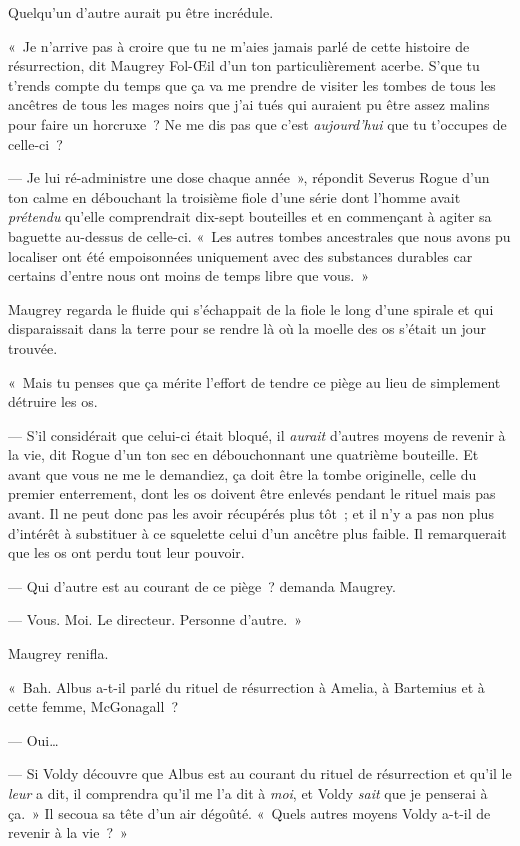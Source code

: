 Quelqu'un d'autre aurait pu être incrédule.

«~Je n'arrive pas à croire que tu ne m'aies jamais parlé de cette histoire de résurrection, dit Maugrey Fol-Œil d'un ton particulièrement acerbe. S'que tu t'rends compte du temps que ça va me prendre de visiter les tombes de tous les ancêtres de tous les mages noirs que j'ai tués qui auraient pu être assez malins pour faire un horcruxe~? Ne me dis pas que c'est \emph{aujourd'hui} que tu t'occupes de celle-ci~?

--- Je lui ré-administre une dose chaque année~», répondit Severus Rogue d'un ton calme en débouchant la troisième fiole d'une série dont l'homme avait \emph{prétendu} qu'elle comprendrait dix-sept bouteilles et en commençant à agiter sa baguette au-dessus de celle-ci. «~Les autres tombes ancestrales que nous avons pu localiser ont été empoisonnées uniquement avec des substances durables car certains d'entre nous ont moins de temps libre que vous.~»

Maugrey regarda le fluide qui s'échappait de la fiole le long d'une spirale et qui disparaissait dans la terre pour se rendre là où la moelle des os s'était un jour trouvée.

«~Mais tu penses que ça mérite l'effort de tendre ce piège au lieu de simplement détruire les os.

--- S'il considérait que celui-ci était bloqué, il \emph{aurait} d'autres moyens de revenir à la vie, dit Rogue d'un ton sec en débouchonnant une quatrième bouteille. Et avant que vous ne me le demandiez, ça doit être la tombe originelle, celle du premier enterrement, dont les os doivent être enlevés pendant le rituel mais pas avant. Il ne peut donc pas les avoir récupérés plus tôt~; et il n'y a pas non plus d'intérêt à substituer à ce squelette celui d'un ancêtre plus faible. Il remarquerait que les os ont perdu tout leur pouvoir.

--- Qui d'autre est au courant de ce piège~? demanda Maugrey.

--- Vous. Moi. Le directeur. Personne d'autre.~»

Maugrey renifla.

«~Bah. Albus a-t-il parlé du rituel de résurrection à Amelia, à Bartemius et à cette femme, McGonagall~?

--- Oui…

--- Si Voldy découvre que Albus est au courant du rituel de résurrection et qu'il le \emph{leur} a dit, il comprendra qu'il me l'a dit à \emph{moi}, et Voldy \emph{sait} que je penserai à ça.~» Il secoua sa tête d'un air dégoûté. «~Quels autres moyens Voldy a-t-il de revenir à la vie~?~»

